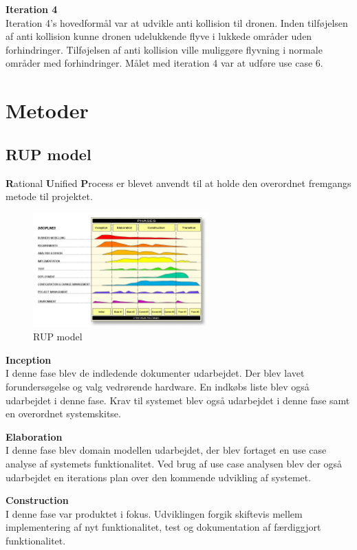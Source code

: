 \textbf{Iteration 4}\\
Iteration 4's hovedformål var at udvikle anti kollision til dronen. Inden tilføjelsen af anti kollision kunne dronen udelukkende flyve i lukkede områder uden forhindringer. Tilføjelsen af anti kollision ville muliggøre flyvning i normale områder med forhindringer. Målet med iteration 4 var at udføre use case 6.

\section{Metoder}

\subsection{RUP model}
\textbf{R}ational \textbf{U}nified \textbf{P}rocess er blevet anvendt til at holde den overordnet fremgangs metode til projektet.  

\begin{figure}[H]
	\centering
	\includegraphics[width=0.60\textwidth]{Billeder/Udviklingsproces/RUP}
	\caption{RUP model}
	\label{fig:rup}
\end{figure}

\textbf{Inception}\\
I denne fase blev de indledende dokumenter udarbejdet. Der blev lavet forundersøgelse og valg vedrørende hardware. En indkøbs liste blev også udarbejdet i denne fase. Krav til systemet blev også udarbejdet i denne fase samt en overordnet systemskitse. 

\textbf{Elaboration}\\
I denne fase blev domain modellen udarbejdet, der blev fortaget en use case analyse af systemets funktionalitet. Ved brug af use case analysen blev der også udarbejdet en iterations plan over den kommende udvikling af systemet. 

\textbf{Construction}\\
I denne fase var produktet i fokus. Udviklingen forgik skiftevis mellem implementering af nyt funktionalitet, test og dokumentation af færdiggjort funktionalitet.

